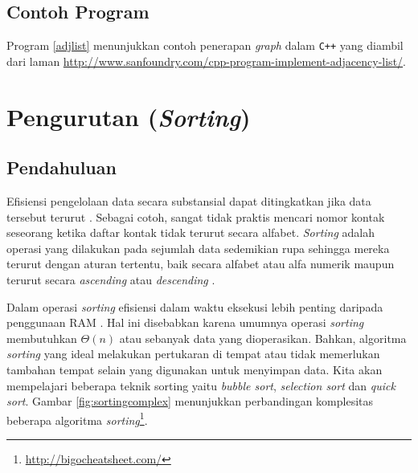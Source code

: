 \section{Contoh Program}
Program \ref{adjlist} menunjukkan contoh penerapan \textit{graph} dalam \texttt{C++} yang diambil dari laman \url{http://www.sanfoundry.com/cpp-program-implement-adjacency-list/}.

\scriptsize

\normalsize


\chapter{Pengurutan (\textit{Sorting})}
\section{Pendahuluan}
Efisiensi pengelolaan data secara substansial dapat ditingkatkan jika data tersebut terurut \cite{adam2001data}. Sebagai cotoh, sangat tidak praktis mencari nomor kontak seseorang ketika daftar kontak tidak terurut secara alfabet. \textit{Sorting} adalah operasi yang dilakukan pada sejumlah data sedemikian rupa sehingga mereka terurut dengan aturan tertentu, baik secara alfabet atau alfa numerik maupun terurut secara \textit{ascending} atau \textit{descending} \cite{group2005data}. 

Dalam operasi \textit{sorting} efisiensi dalam waktu eksekusi lebih penting daripada penggunaan RAM \cite{group2005data}. Hal ini disebabkan karena umumnya operasi \textit{sorting} membutuhkan $\Theta(n)$ atau sebanyak data yang dioperasikan. Bahkan, algoritma \textit{sorting} yang ideal melakukan pertukaran di tempat atau tidak memerlukan tambahan tempat selain yang digunakan untuk menyimpan data. Kita akan mempelajari beberapa teknik sorting yaitu \textit{bubble sort}, \textit{selection sort} dan \textit{quick sort}. Gambar \ref{fig:sortingcomplex} menunjukkan perbandingan komplesitas beberapa algoritma \textit{sorting}\footnote{\url{http://bigocheatsheet.com/}}.

